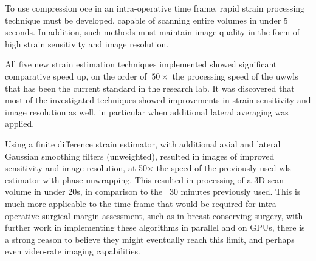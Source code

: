 To use compression \ac{oce} in an intra-operative time frame, rapid strain processing technique must be developed, capable of scanning entire volumes in under 5 seconds. In addition, such methods must maintain image quality in the form of high strain sensitivity and image resolution. 

All five new strain estimation techniques implemented showed significant comparative speed up, on the order of $~50\times$ the processing speed of the \ac{uwwls} that has been the current standard in the research lab. It was discovered that most of the investigated techniques showed improvements in strain sensitivity and image resolution as well, in particular when additional lateral averaging was applied. 

Using a finite difference strain estimator, with additional axial and lateral Gaussian smoothing filters (unweighted), resulted in images of improved sensitivity and image resolution, at 50$\times$ the speed of the previously used \ac{wls} estimator with phase unwrapping. This resulted in processing of a 3D scan volume in under 20s, in comparison to the ~30 minutes previously used. This is much more applicable to the time-frame that would be required for intra-operative surgical margin assessment, such as in breast-conserving surgery, with further work in implementing these algorithms in parallel and on GPUs, there is a strong reason to believe they might eventually reach this limit, and perhaps even video-rate imaging capabilities. 


